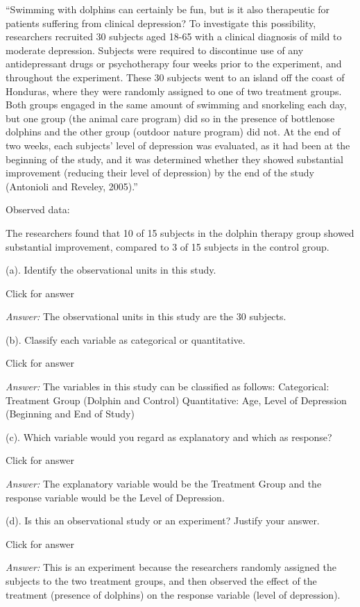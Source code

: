\documentclass[
]{book}
\begin{document}
``Swimming with dolphins can certainly be fun, but is it also therapeutic for patients suffering from clinical depression? To investigate this possibility, researchers recruited 30 subjects aged 18-65 with a clinical diagnosis of mild to moderate depression. Subjects were required to discontinue use of any antidepressant drugs or psychotherapy four weeks prior to the experiment, and throughout the experiment. These 30 subjects went to an island off the coast of Honduras, where they were randomly assigned to one of two treatment groups. Both groups engaged in the same amount of swimming and snorkeling each day, but one group (the animal care program) did so in the presence of bottlenose dolphins and the other group (outdoor nature program) did not. At the end of two weeks, each subjects' level of depression was evaluated, as it had been at the beginning of the study, and it was determined whether they showed substantial improvement (reducing their level of depression) by the end of the study (Antonioli and Reveley, 2005).''

Observed data:

The researchers found that 10 of 15 subjects in the dolphin therapy group showed substantial improvement, compared to 3 of 15 subjects in the control group.

(a). Identify the observational units in this study.

Click for answer

\emph{Answer:} The observational units in this study are the 30 subjects.

(b). Classify each variable as categorical or quantitative.

Click for answer

\emph{Answer:} The variables in this study can be classified as follows:
Categorical: Treatment Group (Dolphin and Control)
Quantitative: Age, Level of Depression (Beginning and End of Study)

(c). Which variable would you regard as explanatory and which as response?

Click for answer

\emph{Answer:} The explanatory variable would be the Treatment Group and the response variable would be the Level of Depression.

(d). Is this an observational study or an experiment? Justify your answer.

Click for answer

\emph{Answer:} This is an experiment because the researchers randomly assigned the subjects to the two treatment groups, and then observed the effect of the treatment (presence of dolphins) on the response variable (level of depression).
\end{document}
